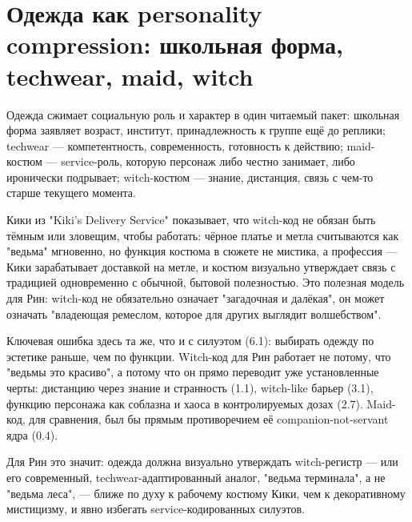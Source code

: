 \section{Одежда как personality compression: школьная форма, techwear, maid, witch}

Одежда сжимает социальную роль и характер в один читаемый пакет: школьная форма заявляет возраст, институт, принадлежность к группе ещё до реплики; techwear — компетентность, современность, готовность к действию; maid-костюм — service-роль, которую персонаж либо честно занимает, либо иронически подрывает; witch-костюм — знание, дистанция, связь с чем-то старше текущего момента.

Кики из "Kiki's Delivery Service" показывает, что witch-код не обязан быть тёмным или зловещим, чтобы работать: чёрное платье и метла считываются как "ведьма" мгновенно, но функция костюма в сюжете не мистика, а профессия — Кики зарабатывает доставкой на метле, и костюм визуально утверждает связь с традицией одновременно с обычной, бытовой полезностью. Это полезная модель для Рин: witch-код не обязательно означает "загадочная и далёкая", он может означать "владеющая ремеслом, которое для других выглядит волшебством".

Ключевая ошибка здесь та же, что и с силуэтом (6.1): выбирать одежду по эстетике раньше, чем по функции. Witch-код для Рин работает не потому, что "ведьмы это красиво", а потому что он прямо переводит уже установленные черты: дистанцию через знание и странность (1.1), witch-like барьер (3.1), функцию персонажа как соблазна и хаоса в контролируемых дозах (2.7). Maid-код, для сравнения, был бы прямым противоречием её companion-not-servant ядра (0.4).

Для Рин это значит: одежда должна визуально утверждать witch-регистр — или его современный, techwear-адаптированный аналог, "ведьма терминала", а не "ведьма леса", — ближе по духу к рабочему костюму Кики, чем к декоративному мистицизму, и явно избегать service-кодированных силуэтов.
